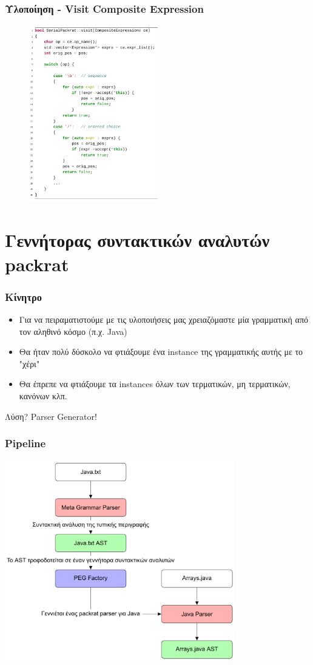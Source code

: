 \documentclass{beamer}
\begin{document}
\begin{frame}
  \frametitle{Υλοποίηση - Visit Composite Expression}
\begin{figure}[h]
    \centering
	\includegraphics[width=0.50\textwidth]{pics/ce}
\end{figure} 
\end{frame}

\section{Γεννήτορας συντακτικών αναλυτών packrat}

\begin{frame}
  \frametitle{Κίνητρο}
  \begin{itemize}
	\item Για να πειραματιστούμε με τις υλοποιήσεις μας χρειαζόμαστε μία γραμματική από τον αληθινό κόσμο (π.χ. Java) \pause
	\item Θα ήταν πολύ δύσκολο να φτιάξουμε ένα instance της γραμματικής αυτής με το "χέρι"
	\item Θα έπρεπε να φτιάξουμε τα instances όλων των τερματικών, μη τερματικών, κανόνων κλπ. \pause
  \end{itemize}
  Λύση? \pause Parser Generator!
\end{frame}

\begin{frame}
  \frametitle{Pipeline}
    \centering
	\includegraphics[width=0.75\textwidth]{pics/pipeline}
\end{frame}
\end{document}
